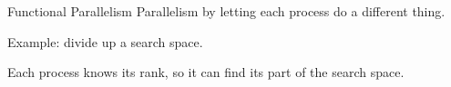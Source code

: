 \begin{numberedframe}{Functional Parallelism}
  Parallelism by letting each process do a different thing.

  Example: divide up a search space.

  Each process knows its rank, so it can find its part of the search space.
\end{numberedframe}

\begin{exerciseframe}[prime]
  
\end{exerciseframe}

\begin{exerciseframe}
  
\end{exerciseframe}

\endinput

\begin{numberedframe}\frametitle{}
\begin{lstlisting}
  
\end{lstlisting}
\end{numberedframe}

